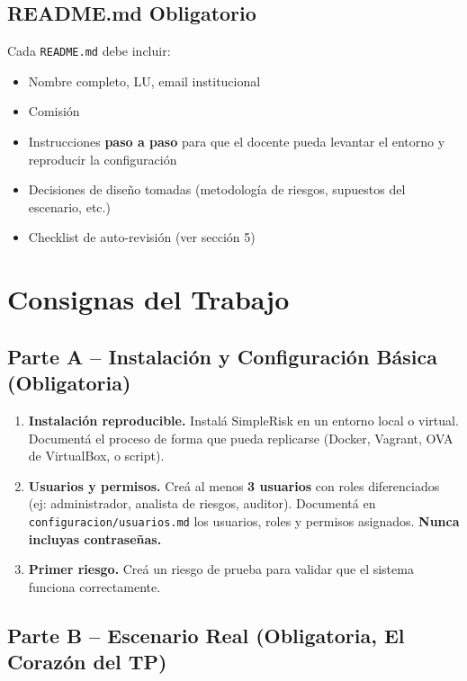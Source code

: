 \documentclass[11pt,a4paper]{article}
\begin{document}
\subsection{README.md Obligatorio}

Cada \texttt{README.md} debe incluir:
\begin{itemize}
    \item Nombre completo, LU, email institucional
    \item Comisión
    \item Instrucciones \textbf{paso a paso} para que el docente pueda levantar el entorno y reproducir la configuración
    \item Decisiones de diseño tomadas (metodología de riesgos, supuestos del escenario, etc.)
    \item Checklist de auto-revisión (ver sección 5)
\end{itemize}

\section{Consignas del Trabajo}

\subsection{Parte A -- Instalación y Configuración Básica (Obligatoria)}

\begin{enumerate}
    \item \textbf{Instalación reproducible.} Instalá SimpleRisk en un entorno local o virtual. Documentá el proceso de forma que pueda replicarse (Docker, Vagrant, OVA de VirtualBox, o script).
    
    \item \textbf{Usuarios y permisos.} Creá al menos \textbf{3 usuarios} con roles diferenciados (ej: administrador, analista de riesgos, auditor). Documentá en \texttt{configuracion/usuarios.md} los usuarios, roles y permisos asignados. \textbf{Nunca incluyas contraseñas.}
    
    \item \textbf{Primer riesgo.} Creá un riesgo de prueba para validar que el sistema funciona correctamente.
\end{enumerate}

\subsection{Parte B -- Escenario Real (Obligatoria, El Corazón del TP)}
\end{document}
